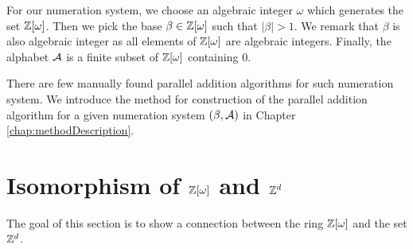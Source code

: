For our numeration system, we choose an algebraic integer $\omega$ which generates the set $\mathbb{Z}[\omega]$. Then we pick the base $\beta\in\mathbb{Z}[\omega]$ such that $|\beta|>1$. We remark that $\beta$ is also algebraic integer as all elements of $\mathbb{Z}[\omega]$ are algebraic integers. Finally, the alphabet $\mathcal{A}$ is a finite subset of $\mathbb{Z}[\omega]$ containing 0.

There are few manually found parallel addition algorithms for such numeration system. We introduce the method for construction of the parallel addition algorithm for a given numeration system $(\beta,\mathcal{A})$ in Chapter \ref{chap:methodDescription}. 
  


\section{\texorpdfstring{Isomorphism of $\mathbb{Z}[\omega]$ and $\mathbb{Z}^{d}$}{Isomorphism of Z[omega] and Zd}}
The goal of this section is to show a connection between the ring $\mathbb{Z}[\omega]$ and the set $\mathbb{Z}^d$. %

